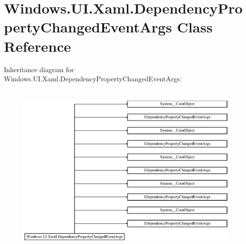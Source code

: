 \hypertarget{class_windows_1_1_u_i_1_1_xaml_1_1_dependency_property_changed_event_args}{}\section{Windows.\+U\+I.\+Xaml.\+Dependency\+Property\+Changed\+Event\+Args Class Reference}
\label{class_windows_1_1_u_i_1_1_xaml_1_1_dependency_property_changed_event_args}
Inheritance diagram for Windows.\+U\+I.\+Xaml.\+Dependency\+Property\+Changed\+Event\+Args\+:\begin{figure}[H]
\begin{center}
\leavevmode
\includegraphics[height=8.750000cm]{class_windows_1_1_u_i_1_1_xaml_1_1_dependency_property_changed_event_args}
\end{center}
\end{figure}
